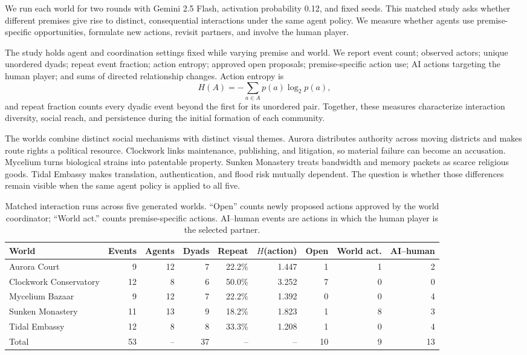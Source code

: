 \documentclass[10pt,twocolumn]{article}
\begin{document}
We run each world for two rounds with Gemini 2.5 Flash, activation probability
0.12, and fixed seeds. This matched study asks whether different premises give
rise to distinct, consequential interactions under the same agent policy. We
measure whether agents use premise-specific opportunities, formulate new
actions, revisit partners, and involve the human player.

The study holds agent and coordination settings fixed while varying premise and
world. We report event count; observed actors; unique unordered dyads; repeat
event fraction; action entropy; approved open proposals; premise-specific
action use; AI actions targeting the human player; and sums of directed
relationship changes. Action entropy is
\[
H(A)=-\sum_{a\in A}p(a)\log_2 p(a),
\]
and repeat fraction counts every dyadic event beyond the first for its unordered
pair. Together, these measures characterize interaction diversity, social
reach, and persistence during the initial formation of each community.

The worlds combine distinct social mechanisms with distinct visual themes.
Aurora distributes authority across moving districts
and makes route rights a political resource. Clockwork links maintenance,
publishing, and litigation, so material failure can become an accusation.
Mycelium turns biological strains into patentable property. Sunken Monastery
treats bandwidth and memory packets as scarce religious goods. Tidal Embassy
makes translation, authentication, and flood risk mutually dependent. The
question is whether those differences remain visible when the same agent policy
is applied to all five.

\begin{table}[t]
\centering
\small
\begin{tabular}{lrrrrrrrr}
\toprule
World & Events & Agents & Dyads & Repeat & $H$(action) & Open & World act. & AI--human \\
\midrule
Aurora Court & 9 & 12 & 7 & 22.2\% & 1.447 & 1 & 1 & 2 \\
Clockwork Conservatory & 12 & 8 & 6 & 50.0\% & 3.252 & 7 & 0 & 0 \\
Mycelium Bazaar & 9 & 12 & 7 & 22.2\% & 1.392 & 0 & 0 & 4 \\
Sunken Monastery & 11 & 13 & 9 & 18.2\% & 1.823 & 1 & 8 & 3 \\
Tidal Embassy & 12 & 8 & 8 & 33.3\% & 1.208 & 1 & 0 & 4 \\
\midrule
Total & 53 & -- & 37 & -- & -- & 10 & 9 & 13 \\
\bottomrule
\end{tabular}
\caption{Matched interaction runs across five generated worlds. ``Open''
counts newly proposed actions approved by the world coordinator; ``World
act.'' counts premise-specific actions. AI--human events are actions in which
the human player is the selected partner.}
\label{tab:multiworld}
\end{table}
\end{document}

